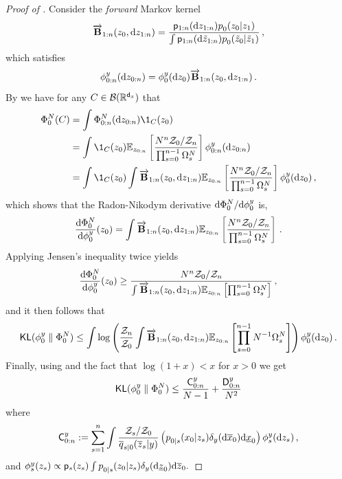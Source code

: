 \begin{proof}[Proof of ]
   Consider the \emph{forward} Markov kernel 
\begin{equation} 
    \fwdker{1:n}{z_0, }{\rmd z_{1:n}} = \frac{\bwmarg{1:n}{\rmd z_{1:n}} \bwtrans{}{0}{z_1}{z_0}}{\int \bwmarg{1:n}{\rmd \tilde{z}_{1:n}} \bwtrans{}{0}{\tilde{z}_1}{\tilde{z}_0}} \eqsp,
\end{equation}
which satisfies 
\[ 
    \filter{0:n}{y}{\rmd z_{0:n}} = \filter{0}{y}{\rmd z_0} \fwdker{1:n}{z_0,}{\rmd z_{1:n}} \eqsp.
\]
By  we have for any $C \in \mathcal{B}(\mathbb{R}^{{\mathsf{d}_x}})$ that 
\begin{align*}
    \bfilter{0}{N}{C} & = \int \bfilter{0:n}{N}{\rmd z_{0:n}} \1_C(z_0) \\
    & = \int \1_C(z_0) \pE _{z_{0:n}} \left[ \frac{N^n \normconst_0 / \normconst_n}{\prod_{s = 0}^{n-1} \sumweight{s}} \right] \filter{0:n}{y}{\rmd z_{0:n}} \\
    & = \int \1_C(z_0) \int \fwdker{1:n}{z_0,}{\rmd z_{1:n}} \pE _{z_{0:n}} \left[ \frac{N^n \normconst_0 / \normconst_n}{\prod_{s = 0}^{n-1} \sumweight{s}} \right] \filter{0}{y}{\rmd z_{0}} \eqsp,
\end{align*}
which shows that the Radon-Nikodym derivative $\rmd \bfilter{0}{N}{} / \rmd \filter{0}{y}{}$ is,
\[ 
    \frac{\rmd \bfilter{0}{N}{}}{\rmd \filter{0}{y}{}}(z_0) = \int \fwdker{1:n}{z_0,}{\rmd z_{1:n}} \pE _{z_{0:n}} \left[ \frac{N^n \normconst_0 / \normconst_n}{\prod_{s = 0}^{n-1} \sumweight{s}} \right] \eqsp.
    \]
Applying Jensen's inequality twice yields
\[ 
    \frac{\rmd \bfilter{0}{N}{}}{\rmd \filter{0}{y}{}}(z_{0}) \geq \frac{N^n \normconst_0 / \normconst_n}{\int \fwdker{1:n}{z_0,}{\rmd z_{1:n}} \pE _{z_{0:n}} \left[ \prod_{s = 0}^{n-1} \sumweight{s} \right]} \eqsp,
\]
and it then follows that 
\[ 
    \kldivergence{\filter{0}{y}{}}{\bfilter{0}{N}{}} \leq \int \log \left( \frac{\normconst_n}{\normconst_0}  \int \fwdker{1:n}{z_0,}{\rmd z_{1:n}} \pE _{z_{0:n}} \left[ \prod_{s = 0}^{n-1} N^{-1} \sumweight{s} \right] \right) \filter{0}{y}{\rmd z_0} \eqsp.
\]
Finally, using  and the fact that $\log(1 + x) < x$ for $x > 0$ we get
\begin{equation*}
    \kldivergence{\filter{0}{y}{}}{\bfilter{0}{N}{}} \leq \frac{\mathsf{C}^\lmeas _{0:n}}{N-1} + \frac{\mathsf{D}^\lmeas _{0:n}}{N^2}
\end{equation*}
where 
\[ 
    \mathsf{C}^\lmeas _{0:n} \eqdef \sum_{s = 1} ^n \int \frac{\normconst_s / \normconst_0}{\tfwtrans{s|0}{\lmeas}{\overline{z}_s} } \left(  \bwtrans{}{0|s}{z_s}{x_0} \delta_{\lmeas}(\rmd \ltopstate_0) \rmd \lbottomstate_0 \right) \filter{s}{\lmeas}{\rmd z_s} \eqsp,
\]
and $\filter{s}{\lmeas}{z_s} \propto \bwmarg{s}{z_s} \int \bwtrans{}{0|s}{z_s}{z_0} \delta_{\lmeas}(\rmd \underline{z}_0) \rmd \overline{z}_0.$
\end{proof}
